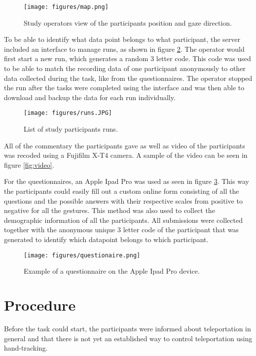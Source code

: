 \begin{figure}[!ht]
    \centering
    \texttt{[image: figures/map.png]}
    \caption{Study operators view of the participants position and gaze direction.}
    \label{fig:map}
\end{figure}

To be able to identify what data point belongs to what participant, the server included an interface to manage runs, as shown in figure \ref{fig:runs}. The operator would first start a new run, which generates a random 3 letter code. This code was used to be able to match the recording data of one participant anonymously to other data collected during the task, like from the questionnaires. The operator stopped the run after the tasks were completed using the interface and was then able to download and backup the data for each run individually.

\begin{figure}[!ht]
    \centering
    \texttt{[image: figures/runs.JPG]}
    \caption{List of study participants runs.}
    \label{fig:runs}
\end{figure}

All of the commentary the participants gave as well as video of the participants was recoded using a Fujifilm X-T4 camera. A sample of the video can be seen in figure \ref{fig:video}.

For the questionnaires, an Apple Ipad Pro was used as seen in figure \ref{fig:Ipad}. This way the participants could easily fill out a custom online form consisting of all the questions and the possible answers with their respective scales from positive to negative for all the gestures. This method was also used to collect the demographic information of all the participants. All submissions were collected together with the anonymous unique 3 letter code of the participant that was generated to identify which datapoint belongs to which participant. 

\begin{figure}[!ht]
    \centering
    \texttt{[image: figures/questionaire.png]}
    \caption{Example of a questionnaire on the Apple Ipad Pro device.}
    \label{fig:Ipad}
\end{figure}

\section{Procedure}
Before the task could start, the participants were informed about teleportation in general and that there is not yet an established way to control teleportation using hand-tracking.


